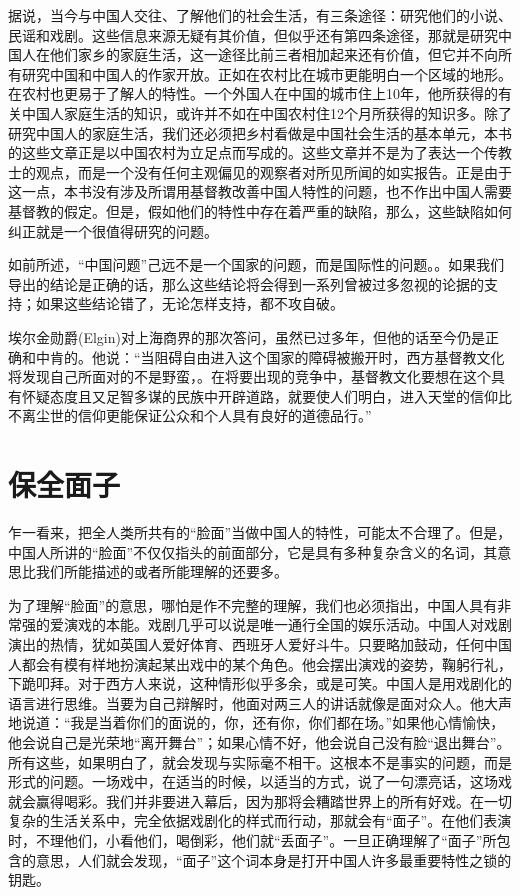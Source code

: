 \documentclass[12pt,oneside]{book}
\begin{document}
\begin{common-format}
据说，当今与中国人交往、了解他们的社会生活，有三条途径：研究他们的小说、民谣和戏剧。这些信息来源无疑有其价值，但似乎还有第四条途径，那就是研究中国人在他们家乡的家庭生活，这一途径比前三者相加起来还有价值，但它并不向所有研究中国和中国人的作家开放。正如在农村比在城市更能明白一个区域的地形。在农村也更易于了解人的特性。一个外国人在中国的城市住上10年，他所获得的有关中国人家庭生活的知识，或许并不如在中国农村住12个月所获得的知识多。除了研究中国人的家庭生活，我们还必须把乡村看做是中国社会生活的基本单元，本书的这些文章正是以中国农村为立足点而写成的。这些文章并不是为了表达一个传教士的观点，而是一个没有任何主观偏见的观察者对所见所闻的如实报告。正是由于这一点，本书没有涉及所谓用基督教改善中国人特性的问题，也不作出中国人需要基督教的假定。但是，假如他们的特性中存在着严重的缺陷，那么，这些缺陷如何纠正就是一个很值得研究的问题。 

如前所述，“中国问题”己远不是一个国家的问题，而是国际性的问题。。如果我们导出的结论是正确的话，那么这些结论将会得到一系列曾被过多忽视的论据的支持；如果这些结论错了，无论怎样支持，都不攻自破。 

埃尔金勋爵(Elgin)对上海商界的那次答问，虽然已过多年，但他的话至今仍是正确和中肯的。他说：“当阻碍自由进入这个国家的障碍被搬开时，西方基督教文化将发现自己所面对的不是野蛮，。在将要出现的竞争中，基督教文化要想在这个具有怀疑态度且又足智多谋的民族中开辟道路，就要使人们明白，进入天堂的信仰比不离尘世的信仰更能保证公众和个人具有良好的道德品行。”


\chapter{保全面子}
乍一看来，把全人类所共有的“脸面”当做中国人的特性，可能太不合理了。但是，中国人所讲的“脸面”不仅仅指头的前面部分，它是具有多种复杂含义的名词，其意思比我们所能描述的或者所能理解的还要多。 

为了理解“脸面”的意思，哪怕是作不完整的理解，我们也必须指出，中国人具有非常强的爱演戏的本能。戏剧几乎可以说是唯一通行全国的娱乐活动。中国人对戏剧演出的热情，犹如英国人爱好体育、西班牙人爱好斗牛。只要略加鼓动，任何中国人都会有模有样地扮演起某出戏中的某个角色。他会摆出演戏的姿势，鞠躬行礼，下跪叩拜。对于西方人来说，这种情形似乎多余，或是可笑。中国人是用戏剧化的语言进行思维。当要为自己辩解时，他面对两三人的讲话就像是面对众人。他大声地说道：“我是当着你们的面说的，你，还有你，你们都在场。”如果他心情愉快，他会说自己是光荣地“离开舞台”；如果心情不好，他会说自己没有脸“退出舞台”。所有这些，如果明白了，就会发现与实际毫不相干。这根本不是事实的问题，而是形式的问题。一场戏中，在适当的时候，以适当的方式，说了一句漂亮话，这场戏就会赢得喝彩。我们并非要进入幕后，因为那将会糟踏世界上的所有好戏。在一切复杂的生活关系中，完全依据戏剧化的样式而行动，那就会有“面子”。在他们表演时，不理他们，小看他们，喝倒彩，他们就“丢面子”。一旦正确理解了“面子”所包含的意思，人们就会发现，“面子”这个词本身是打开中国人许多最重要特性之锁的钥匙。


\end{common-format}
\end{document}
